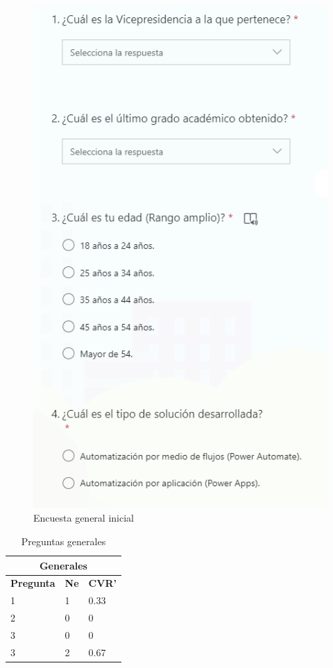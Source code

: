 \begin{figure}[H]
	\centering
	\includegraphics[scale=0.5]{Capitulo5/imagenes/f1}
	\caption{Encuesta general inicial}
	\label{fig:fomrs1}
\end{figure}


\begin{table}[H]
	\centering
	\begin{tabular}{|p{3cm}|p{3cm}|p{3cm} |}
		\hline
		\multicolumn{3}{|c|}{Generales} \\
		\hline
		\textbf{Pregunta}& \textbf{Ne}&\textbf{CVR'}\\
		\hline
		1&1&0.33\\
		\hline
		2&0&0\\
		\hline
		3&0&0\\
		\hline
		3&2&0.67\\
		\hline
			
	\end{tabular}
	\label{tabla:generales}
	\caption{Preguntas generales}
\end{table}

